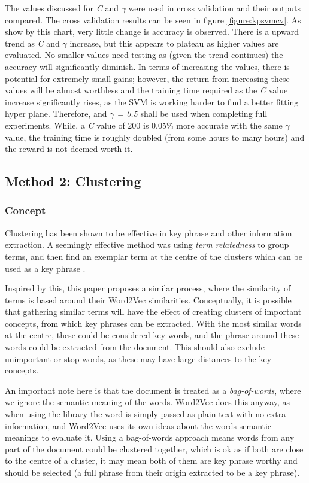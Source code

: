 The values discussed for \textit{C} and $\gamma$ were used in cross validation and their outputs compared. The cross validation results can be seen in figure \ref{figure:kpsvmcv}. As show by this chart, very little change is accuracy is observed. There is a upward trend as \textit{C} and $\gamma$ increase, but this appears to plateau as higher values are evaluated. No smaller values need testing as (given the trend continues) the accuracy will significantly diminish. In terms of increasing the values, there is potential for extremely small gains; however, the return from increasing these values will be almost worthless and the training time required as the \textit{C} value increase significantly rises, as the SVM is working harder to find a better fitting hyper plane. Therefore,  and \textit{$\gamma$ = 0.5} shall be used when completing full experiments. While, a \textit{C} value of 200 is 0.05\% more accurate with the same $\gamma$ value, the training time is roughly doubled (from some hours to many hours) and the reward is not deemed worth it.

\subsection{Method 2: Clustering}
\subsubsection*{Concept}
Clustering has been shown to be effective in key phrase and other information extraction. A seemingly effective method was using \textit{term relatedness} to group terms, and then find an exemplar term at the centre of the clusters which can be used as a key phrase \cite{Liu2009}. 

Inspired by this, this paper proposes a similar process, where the similarity of terms is based around their Word2Vec similarities. Conceptually, it is possible that gathering similar terms will have the effect of creating clusters of important concepts, from which key phrases can be extracted. With the most similar words at the centre, these could be considered key words, and the phrase around these words could be extracted from the document. This should also exclude unimportant or stop words, as these may have large distances to the key concepts. 

An important note here is that the document is treated as a \textit{bag-of-words}, where we ignore the semantic meaning of the words. Word2Vec does this anyway, as when using the library the word is simply passed as plain text with no extra information, and Word2Vec uses its own ideas about the words semantic meanings to evaluate it. Using a bag-of-words approach means words from any part of the document could be clustered together, which is ok as if both are close to the centre of a cluster, it may mean both of them are key phrase worthy and should be selected (a full phrase from their origin extracted to be a key phrase).

